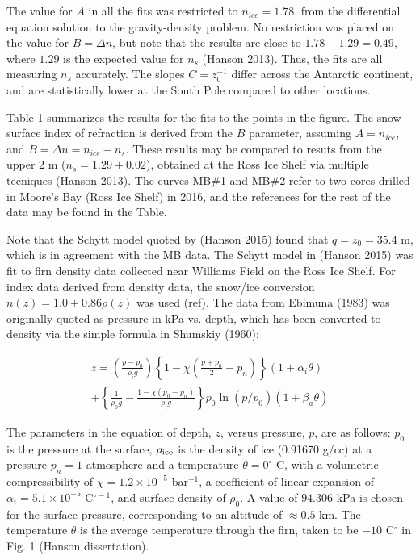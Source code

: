 \documentclass[12pt]{article}
\begin{document}
The value for $A$ in all the fits was restricted to $n_{ice} = 1.78$, from the differential equation solution to the gravity-density problem.  No restriction was placed on the value for $B=\Delta n$, but note that the results are close to $1.78-1.29 = 0.49$, where $1.29$ is the expected value for $n_s$ (Hanson 2013).  Thus, the fits are all measuring $n_s$ accurately.  The slopes $C = z_0^{-1}$ differ across the Antarctic continent, and are statistically lower at the South Pole compared to other locations.

Table 1 summarizes the results for the fits to the points in the figure.  The snow surface index of refraction is derived from the $B$ parameter, assuming $A = n_{ice}$, and $B = \Delta n = n_{ice} - n_s$.  These results may be compared to resuts from the upper 2 m ($n_s = 1.29\pm0.02$), obtained at the Ross Ice Shelf via multiple tecniques (Hanson 2013).  The curves MB\#1 and MB\#2 refer to two cores drilled in Moore's Bay (Ross Ice Shelf) in 2016, and the references for the rest of the data may be found in the Table.

Note that the Schytt model quoted by (Hanson 2015) found that $q = z_0 = 35.4$ m, which is in agreement with the MB data.  The Schytt model in (Hanson 2015) was fit to firn density data collected near Williams Field on the Ross Ice Shelf.  For index data derived from density data, the snow/ice conversion $n(z) = 1.0 + 0.86\rho(z)$ was used (ref).  The data from Ebimuna (1983) was originally quoted as pressure in kPa vs. depth, which has been converted to density via the simple formula in Shumskiy (1960):

\begin{multline}
z = \left( \frac{p-p_0}{\rho_i g}\right) \left \lbrace 1-\chi\left(\frac{p+p_0}{2} - p_n \right) \right \rbrace (1+\alpha_i\theta) \\ + \left \lbrace \frac{1}{\rho_0 g}-\frac{1-\chi(p_0-p_n)}{\rho_i g} \right \rbrace p_0 \ln (p/p_0) (1+\beta_a\theta)
\end{multline}

The parameters in the equation of depth, $z$, versus pressure, $p$, are as follows: $p_0$ is the pressure at the surface, $\rho_{\rm ice}$ is the density of ice (0.91670 g/cc) at a pressure $p_n=1$ atmosphere and a temperature $\theta = 0^{\circ}$ C, with a  volumetric compressibility of $\chi = 1.2 \times 10^{-5}$ bar$^{-1}$, a coefficient of linear expansion of $\alpha_i = 5.1 \times 10^{-5}$ C$^{\circ -1}$, and surface density of $\rho_0$.  A value of $94.306$ kPa is chosen for the surface pressure, corresponding to an altitude of $\approx 0.5$ km.  The temperature $\theta$ is the average temperature through the firn, taken to be $-10$ C$^{\circ}$ in Fig. 1 (Hanson dissertation).
\end{document}
